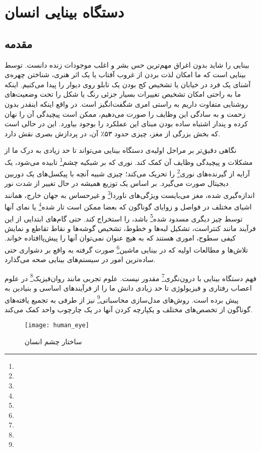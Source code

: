 \chapter{دستگاه بینایی انسان}
\section{مقدمه}
بینایی را شاید بدون اغراق مهم‌ترین حس بشر و اغلب موجودات زنده دانست. توسط بینایی است که ما امکان لذت بردن از غروب آفتاب یا یک اثر هنری، شناختن چهره‌ی آشنای یک فرد در خیابان یا  تشخیص کج بودن یک تابلو روی دیوار را پیدا می‌کنیم. اینکه ما به راحتی امکان تشخیص تغییرات بسیار جزئی رنگ یا شکل را تحت وضعیت‌های روشنایی متفاوت داریم به راستی امری شگفت‌انگیز است. در واقع اینکه اینقدر بدون زحمت و به سادگی این وظایف را صورت می‌دهیم، ممکن است پیچیدگی آن را نهان کرده و پندار اشتباه ساده بودن مبنای این عملکرد را بوجود بیاورد. این در حالی است که بخش بزرگی از مغز، چیزی حدود ۵۳٪ آن، در پردازش بصری نقش دارد. 

نگاهی دقیق‌تر بر مراحل اولیه‌ی دستگاه بینایی می‌تواند تا حد زیادی به درک ما از مشکلات و پیچیدگی وظایف آن کمک کند. نوری که بر شبکیه چشم\footnote{} تابیده می‌شود، یک آرایه از گیرنده‌های نوری\footnote{} را تحریک می‌کند؛ چیزی شبیه آنچه با پیکسل‌های یک دوربین دیجیتال صورت می‌گیرد. بر اساس یک توزیع همیشه در حال تغییر از شدت نور اندازه‌گیری شده، مغز می‌بایست ویژگی‌های ناوردا\footnote{} و غیرحساس به جهان خارج، همانند اشیای مختلف در فواصل و زوایای گوناگون که بعضا ممکن است تار شده\footnote{} یا نمای آنها توسط چیز دیگری مسدود شده\footnote{} باشد، را استخراج کند. حتی گام‌های ابتدایی از این فرآیند مانند کنتراست، تشکیل لبه‌ها و خطوط، تشخیص گوشه‌ها و نقاط تقاطع و نمایش کیفی سطوح، اموری هستند که به هیچ عنوان نمی‌توان آنها را پیش‌پا‌افتاده خواند. تلاش‌ها و مطالعات اولیه که در بینایی ماشین\footnote{} صورت گرفته به واقع بر دشواری حتی ساده‌ترین امور در سیستم‌های بینایی صحه می‌گذارد. 

فهم دستگاه بینایی با درون‌نگری\footnote{} مقدور نیست. علوم تجربی مانند روان‌فیزیک\footnote{} در علوم اعصاب رفتاری و فیزیولوژی تا حد زیادی دانش ما را از فرآیند‌های اساسی و بنیادین به پیش برده است. روش‌های مدل‌سازی محاسباتی\footnote{} نیز از طرفی به تجمیع یافته‌های گوناگون از تخصص‌های مختلف و یکپارچه کردن آنها در یک چارچوب واحد کمک می‌کند. 

\begin{figure}
\centering
{\footnotesize
\texttt{[image: human\_eye]}
\caption{ساختار چشم انسان}
\label{fig:human_eye}
}
\end{figure}

